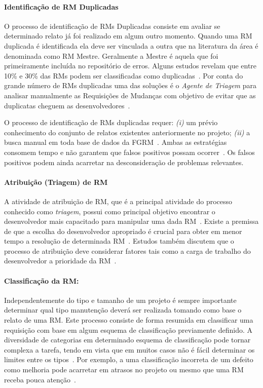 \paragraph{Identificação de RM Duplicadas} O processo de identificação de RMs
Duplicadas consiste em avaliar se determinado relato já foi realizado em algum
outro momento. Quando uma RM duplicada é identificada ela deve ser vinculada a
outra que na literatura da área é denominada como RM Mestre. Geralmente a Mestre
é aquela que foi primeiramente incluída no repositório de erros. Alguns estudos
revelam que entre 10\% e 30\% das RMs podem ser classificadas como
duplicadas~\cite{anvik2005coping,cavalcanti2013bug,Runeson:2007:DDD:1248820.1248882}.
Por conta do grande número de RMs duplicadas uma das soluções é o
\textit{Agente de Triagem} para analisar manualmente as Requisições de Mudanças
com objetivo de evitar que as duplicatas cheguem as
desenvolvedores~\cite{anvik2005coping}.

O processo de identificação de RMs duplicadas requer: \textit{(i)} um prévio
conhecimento do conjunto de relatos existentes anteriormente no projeto;
\textit{(ii)} a busca manual em toda base de dados da
FGRM~\cite{banerjee2012automated,
	Lerch:2013:FDY:2495256.2495763,hindle2016contextual}. Ambas as estratégias
consomem tempo e não garantem que falsos positivos possam
ocorrer~\cite{kaushik2012comparative}. Os falsos positivos podem ainda acarretar
na desconsideração de problemas relevantes.

\paragraph{Atribuição (Triagem) de RM} A atividade de atribuição de RM, que é a
principal atividade do processo conhecido como \textit{triagem}, possui como
principal objetivo encontrar o desenvolvedor mais capacitado para manipular uma
dada RM~\cite{cavalcanti2014challenges}. Existe a premissa de que a escolha do
desenvolvedor apropriado é crucial para obter em menor tempo a re\-so\-lu\-ção
de determinada RM~\cite{di2002approach}. Estudos também discutem que o processo
de atribuição deve considerar fatores tais como a carga de trabalho do
desenvolvedor a prioridade da RM~\cite{aljarah2011selecting}.

\paragraph{Classificação da RM:} Independentemente do tipo e tamanho de um
projeto é sempre importante determinar qual tipo manutenção deverá ser realizada
tomando como base o relato de uma RM\@.  Este processo consiste de forma
resumida em classificar uma requisição com base em algum esquema de
classificação previamente definido. A diversidade de categorias em determinado
esquema de classificação pode tornar complexa a tarefa, tendo em vista que em
muitos casos não é fácil determinar os limites entre os
tipos~\cite{antoniol2008bug}. Por exemplo, a uma classificação incorreta de um
defeito como melhoria pode acarretar em atrasos no projeto ou mesmo que uma RM
receba pouca atenção~\cite{cavalcanti2014challenges}.

